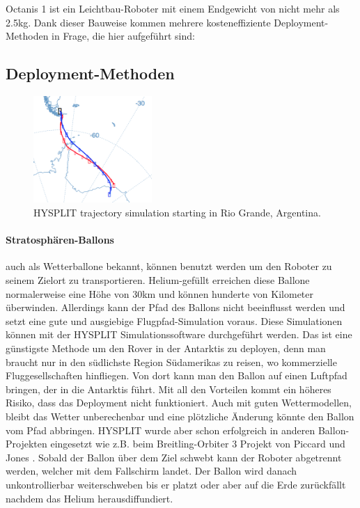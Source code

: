 \documentclass[a4paper,12pt]{article}
\begin{document}
Octanis 1 ist ein Leichtbau-Roboter mit einem Endgewicht von nicht mehr als 2.5kg. Dank dieser Bauweise kommen mehrere kosteneffiziente Deployment-Methoden in Frage, die hier aufgeführt sind: 

\subsection{Deployment-Methoden}

\begin{figure}[h!]
	\centering
    \includegraphics[width=0.4\textwidth]{trajectory}
    \caption{HYSPLIT trajectory simulation starting in Rio Grande, Argentina.} %
\end{figure}

\paragraph{Stratosphären-Ballons} auch als Wetterballone bekannt, können benutzt werden um den Roboter zu seinem Zielort zu transportieren. Helium-gefüllt erreichen diese Ballone normalerweise eine Höhe von 30km und können hunderte von Kilometer überwinden. Allerdings kann der Pfad des Ballons nicht beeinflusst werden und setzt eine gute und ausgiebige Flugpfad-Simulation voraus. Diese Simulationen können mit der HYSPLIT Simulationssoftware \cite{hysplit} \cite{hysplitjava} durchgeführt werden. Das ist eine günstigste Methode um den Rover in der Antarktis zu deployen, denn man braucht nur in den südlichste Region Südamerikas zu reisen, wo kommerzielle Fluggesellschaften hinfliegen. Von dort kann man den Ballon auf einen Luftpfad bringen, der in die Antarktis führt. Mit all den Vorteilen kommt ein höheres Risiko, dass das Deployment nicht funktioniert. Auch mit guten Wettermodellen, bleibt das Wetter unberechenbar und eine plötzliche Änderung könnte den Ballon vom Pfad abbringen. HYSPLIT wurde aber schon erfolgreich in anderen Ballon-Projekten eingesetzt wie z.B. beim Breitling-Orbiter 3 Projekt von Piccard und Jones \cite{hysplitexamples}.
Sobald der Ballon über dem Ziel schwebt kann der Roboter abgetrennt werden, welcher mit dem Fallschirm landet. Der Ballon wird danach unkontrollierbar weiterschweben bis er platzt oder aber auf die Erde zurückfällt nachdem das Helium herausdiffundiert.
\end{document}
